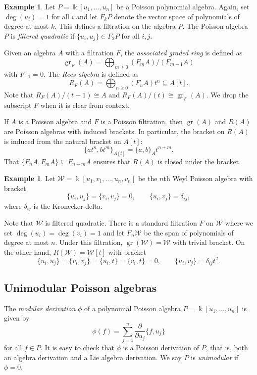 \documentclass[reqno]{amsart}
\numberwithin{equation}{section}
\theoremstyle{definition}
\newtheorem{example}[theorem]{Example}
\DeclareMathOperator\gr{gr}
\newcommand\iso{\cong}
\newcommand\kk{\Bbbk}
\newcommand\pw{\mathcal W}
\begin{document}
\begin{example}
Let $P=\kk[u_1,\hdots,u_n]$ be a Poisson polynomial algebra. Again, set $\deg(u_i)=1$ for all $i$ and let $F_k P$ denote the vector space of polynomials of degree at most $k$. This defines a filtration on the algebra $P$. The Poisson algebra $P$ is \emph{filtered quadratic} if $\{u_i,u_j\} \in F_2 P$ for all $i,j$.  
\end{example}

Given an algebra $A$ with a filtration $F$, the \emph{associated graded ring} is defined as
\[ \gr_F(A) = \bigoplus_{m \geq 0} (F_m A)/(F_{m-1} A)\]
with $F_{-1}=0$. The \emph{Rees algebra} is defined as
\[ R_F(A) = \bigoplus_{n \geq 0} (F_n A)t^n \subseteq A[t].\]
Note that $R_F(A)/(t-1) \iso A$ and $R_F(A)/(t) \iso \gr_F(A)$. We drop the subscript $F$ when it is clear from context.

If $A$ is a Poisson algebra and $F$ is a Poisson filtration, then $\gr(A)$ and $R(A)$ are Poisson algebras with induced brackets. In particular, the bracket on $R(A)$ is induced from the natural bracket on $A[t]$:
\[ \{ at^n,bt^m\}_{A[t]} = \{a,b\}_A t^{n+m}.\]
That $\{ F_n A, F_m A \} \subseteq F_{n+m}A$ ensures that $R(A)$ is closed under the bracket.

\begin{example}\label{ex.pweyl}
Let $\pw = \kk[u_1,v_1,\hdots,u_n,v_n]$ be the $n$th Weyl Poisson algebra with bracket
\[ \{u_i,u_j\} = \{v_i,v_j\} = 0, \qquad \{u_i,v_j\} = \delta_{ij},\]
where $\delta_{ij}$ is the Kronecker-delta.

Note that $\pw$ is filtered quadratic. There is a standard filtration $F$ on $\pw$ where we set $\deg(u_i)=\deg(v_i)=1$ and let $F_n \pw$ be the span of polynomials of degree at most $n$. Under this filtration, $\gr(\pw) = \pw$ with trivial bracket. On the other hand, $R(\pw)=\pw[t]$ with bracket
\[ \{u_i,u_j\} = \{v_i,v_j\} = \{ u_i,t\} = \{v_i,t\} = 0, \qquad \{u_i,v_j\} = \delta_{ij} t^2.\]
\end{example}

\subsection{Unimodular Poisson algebras}

The \emph{modular derivation} $\phi$ of a polynomial Poisson algebra $P=\kk[u_1,\hdots,u_n]$ is given by
\[ \phi(f) = \sum_{j=1}^n \frac{\partial}{\partial u_j} \{f,u_j\}\]
for all $f \in P$. It is easy to check that $\phi$ is a Poisson derivation of $P$, that is, both an algebra derivation and a Lie algebra derivation. We say $P$ is \emph{unimodular} if $\phi=0$. 
\end{document}
